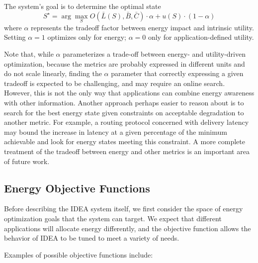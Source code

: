 The system's goal is to determine the optimal state \[ S^\star = \arg
\max_{S} O(\bar{L}(S), \bar{B}, \bar{C}) \cdot \alpha + u(S) \cdot
(1-\alpha)\] where $\alpha$ represents the tradeoff factor between energy
impact and intrinsic utility. Setting $\alpha=1$ optimizes only for energy;
$\alpha=0$ only for application-defined utility.

Note that, while $\alpha$ parameterizes a trade-off between energy- and
utility-driven optimization, because the metrics are probably expressed in
different units and do not scale linearly, finding the $\alpha$ parameter
that correctly expressing a given tradeoff is expected to be challenging, and
may require an online search. However, this is not the only way that
applications can combine energy awareness with other information. Another
approach perhaps easier to reason about is to search for the best energy
state given constraints on acceptable degradation to another metric. For
example, a routing protocol concerned with delivery latency may bound the
increase in latency at a given percentage of the minimum achievable and look
for energy states meeting this constraint. A more complete treatment of the
tradeoff between energy and other metrics is an important area of future
work.

\subsection{Energy Objective Functions}
\label{idea-subsec-energyobjectivefunctions}

Before describing the IDEA system itself, we first consider the space of
energy optimization goals that the system can target. We expect that
different applications will allocate energy differently, and the objective
function allows the behavior of IDEA to be tuned to meet a variety of needs.

Examples of possible objective functions include:

